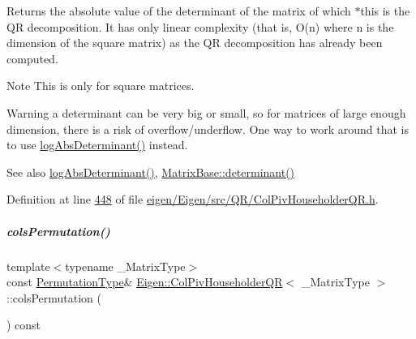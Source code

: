 \begin{DoxyReturn}{Returns}
the absolute value of the determinant of the matrix of which $\ast$this is the QR decomposition. It has only linear complexity (that is, O(n) where n is the dimension of the square matrix) as the QR decomposition has already been computed.
\end{DoxyReturn}
\begin{DoxyNote}{Note}
This is only for square matrices.
\end{DoxyNote}
\begin{DoxyWarning}{Warning}
a determinant can be very big or small, so for matrices of large enough dimension, there is a risk of overflow/underflow. One way to work around that is to use \hyperlink{group___q_r___module_afdc29438a335871f67449c253369ce12}{log\+Abs\+Determinant()} instead.
\end{DoxyWarning}
\begin{DoxySeeAlso}{See also}
\hyperlink{group___q_r___module_afdc29438a335871f67449c253369ce12}{log\+Abs\+Determinant()}, \hyperlink{group___core___module_a7ad8f77004bb956b603bb43fd2e3c061}{Matrix\+Base\+::determinant()} 
\end{DoxySeeAlso}


Definition at line \hyperlink{eigen_2_eigen_2src_2_q_r_2_col_piv_householder_q_r_8h_source_l00448}{448} of file \hyperlink{eigen_2_eigen_2src_2_q_r_2_col_piv_householder_q_r_8h_source}{eigen/\+Eigen/src/\+Q\+R/\+Col\+Piv\+Householder\+Q\+R.\+h}.

\mbox{\label{group___q_r___module_ab6ad43e6a6fb75726eae0d5499948f4a}} 
\subparagraph{\texorpdfstring{cols\+Permutation()}{colsPermutation()}\hspace{0.1cm}{\footnotesize\ttfamily [1/2]}}
{\footnotesize\ttfamily template$<$typename \+\_\+\+Matrix\+Type$>$ \\
const \hyperlink{group___core___module}{Permutation\+Type}\& \hyperlink{group___q_r___module_class_eigen_1_1_col_piv_householder_q_r}{Eigen\+::\+Col\+Piv\+Householder\+QR}$<$ \+\_\+\+Matrix\+Type $>$\+::cols\+Permutation (\begin{DoxyParamCaption}{ }\end{DoxyParamCaption}) const\hspace{0.3cm}{\ttfamily [inline]}}

